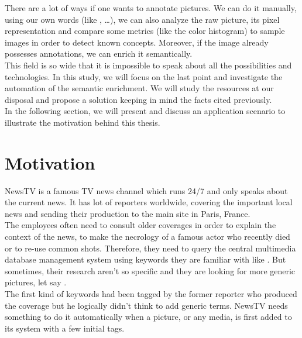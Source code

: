 There are a lot of ways if one wants to annotate pictures. We can do it manually, using our own words (like ,  \dots), we can also analyze the raw picture, its pixel representation and compare some metrics (like the color histogram) to sample images in order to detect known concepts. Moreover, if the image already possesses annotations, we can enrich it semantically. \\

This field is so wide that it is impossible to speak about all the possibilities and technologies. In this study, we will focus on the last point and investigate the automation of the semantic enrichment. We will study the resources at our disposal and propose a solution keeping in mind the facts cited previously.\\

In the following section, we will present and discuss an application scenario to illustrate the motivation behind this thesis.



\section{Motivation} %
\label{sec:motivation}

NewsTV is a famous TV news channel which runs 24/7 and only speaks about the current news. It has lot of reporters worldwide, covering the important local news and sending their production to the main site in Paris, France.\\

The employees often need to consult older coverages in order to explain the context of the news, to make the necrology of a famous actor who recently died or to re-use common shots. 
Therefore, they need to query the central multimedia database management system using keywords they are familiar with like . But sometimes, their research aren't so specific and they are looking for more generic pictures, let say .\\

The first kind of keywords had been tagged by the former reporter who produced the coverage but he logically didn't think to add generic terms. NewsTV needs something to do it automatically when a picture, or any media, is first added to its system with a few initial tags.\\

